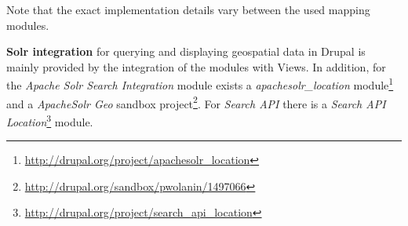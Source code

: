 Note that the exact implementation details vary between the used mapping modules.

\textbf{Solr integration} for querying and displaying geospatial data in Drupal is mainly provided by the integration of the modules with Views. In addition, for the \textit{Apache Solr Search Integration} module exists a \textit{apachesolr\_location} module\footnote{\url{http://drupal.org/project/apachesolr_location}} and a \textit{ApacheSolr Geo} sandbox project\footnote{\url{http://drupal.org/sandbox/pwolanin/1497066}}. For \textit{Search API} there is a \textit{Search API Location}\footnote{\url{http://drupal.org/project/search_api_location}} module.



